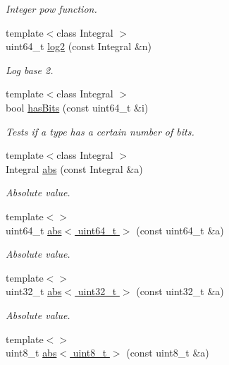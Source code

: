 \begin{DoxyCompactItemize}
\begin{DoxyCompactList}\small\item\em Integer pow function. \end{DoxyCompactList}\item 
{\footnotesize template$<$class Integral $>$ }\\uint64\+\_\+t \hyperlink{namespacecryptomath_a72742b30d75eae62e700454832df24c6}{log2} (const Integral \&n)
\begin{DoxyCompactList}\small\item\em Log base 2. \end{DoxyCompactList}\item 
{\footnotesize template$<$class Integral $>$ }\\bool \hyperlink{namespacecryptomath_ad160be1fb9fce8cfb5862366d2298f13}{has\+Bits} (const uint64\+\_\+t \&i)
\begin{DoxyCompactList}\small\item\em Tests if a type has a certain number of bits. \end{DoxyCompactList}\item 
{\footnotesize template$<$class Integral $>$ }\\Integral \hyperlink{namespacecryptomath_abfbfbbf081ad84dfad43a2fa928d6bc8}{abs} (const Integral \&a)
\begin{DoxyCompactList}\small\item\em Absolute value. \end{DoxyCompactList}\item 
{\footnotesize template$<$$>$ }\\uint64\+\_\+t \hyperlink{namespacecryptomath_a7f99173aeb277588bc453a6bb6dc8e0b}{abs$<$ uint64\+\_\+t $>$} (const uint64\+\_\+t \&a)
\begin{DoxyCompactList}\small\item\em Absolute value. \end{DoxyCompactList}\item 
{\footnotesize template$<$$>$ }\\uint32\+\_\+t \hyperlink{namespacecryptomath_a6c5d524cfbc767ac94668ea02f851d23}{abs$<$ uint32\+\_\+t $>$} (const uint32\+\_\+t \&a)
\begin{DoxyCompactList}\small\item\em Absolute value. \end{DoxyCompactList}\item 
{\footnotesize template$<$$>$ }\\uint8\+\_\+t \hyperlink{namespacecryptomath_aa5431f9c91fc877731b94cc3a4496c10}{abs$<$ uint8\+\_\+t $>$} (const uint8\+\_\+t \&a)

\end{DoxyCompactItemize}
